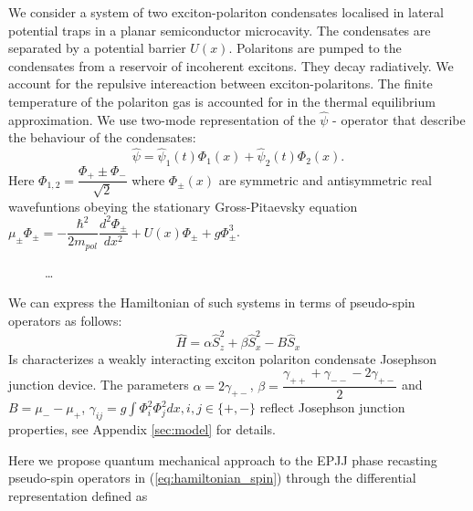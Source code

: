 \documentclass[aps, pre, preprint, groupedaddress, superscriptaddress, showkeys, showpacs] {revtex4-1}
\newcommand{\red}{\color{red}}
\begin{document}
{\red

We consider a system of two exciton-polariton condensates localised in lateral potential traps in a planar semiconductor microcavity.
The condensates are separated by a potential barrier $U(x)$.
Polaritons are pumped to the condensates from a reservoir of incoherent excitons.
They decay radiatively.
We account for the repulsive intereaction between exciton-polaritons.
The finite temperature of the polariton gas is accounted for in the thermal equilibrium approximation.
We use two-mode representation of the $\hat{\psi}$ - operator that describe the behaviour of the condensates:
%
\begin{equation}
\hat{\psi} = \hat{\psi}_1(t) \Phi_1(x) + \hat{\psi}_2(t) \Phi_2(x).
\end{equation}
%
Here $\Phi_{1,2} = \dfrac{\Phi_+ \pm \Phi_-}{\sqrt{2}}$ where $\Phi_{\pm}(x)$ are symmetric and antisymmetric real wavefuntions obeying the stationary Gross-Pitaevsky equation $\mu_{\pm} \Phi_{\pm} = -\dfrac{\hbar^2}{2m_{pol}} \dfrac{d^2 \Phi_{\pm}}{dx^2} + U(x) \Phi_{\pm} + g \Phi_{\pm}^3$.

%
\begin{figure}[ht]
\caption{ \dots \label{pic:potential_picture}}
\end{figure}
%

We can express the Hamiltonian of such systems in terms of pseudo-spin operators as follows:
%
\begin{equation}
\hat{H} = \alpha \hat{S}_z^2 + \beta \hat{S}_x^2 - B \hat{S}_x
\label{eq:hamiltonian_spin}
\end{equation}
Is characterizes a weakly interacting exciton polariton condensate Josephson junction device.
The parameters $\alpha = 2 \gamma_{+-}$, $\beta = \dfrac{\gamma_{++} + \gamma_{--} - 2 \gamma_{+-}}{2}$ and $B = \mu_- - \mu_+$, $\gamma_{ij} = g \int \Phi_i^2 \Phi_j^2 dx, i,j \in \{+,-\}$ reflect Josephson junction properties, see Appendix \ref{sec:model} for details.
}
Here we propose quantum mechanical approach to the EPJJ  phase recasting pseudo-spin operators in  (\ref{eq:hamiltonian_spin}) through the differential representation defined as
\end{document}
